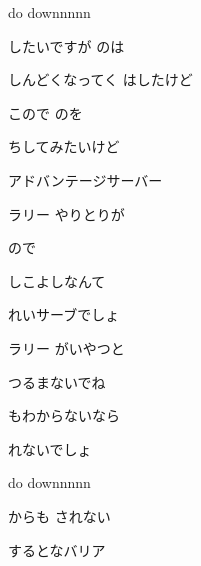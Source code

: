 \documentclass[a4paper,tate,twocolumn,12pt]{ltjtarticle}
\begin{document}
\begin{flushleft}
\vspace{2em}

\noindent\begin{minipage}{\linewidth}
do downnnnn
\end{minipage}

\vspace{3em}

\noindent\begin{minipage}{\linewidth}
したいですが のは

しんどくなってく はしたけど

こので のを

ちしてみたいけど

アドバンテージサーバー
\end{minipage}

\vspace{2em}

\noindent\begin{minipage}{\linewidth}
ラリー やりとりが

ので

しこよしなんて

れいサーブでしょ

ラリー がいやつと

つるまないでね

もわからないなら

れないでしょ
\end{minipage}

\vspace{2em}

\noindent\begin{minipage}{\linewidth}
do downnnnn
\end{minipage}

\vspace{3em}

\noindent\begin{minipage}{\linewidth}
からも されない

 するとなバリア


\end{minipage}
\end{flushleft}
\end{document}
